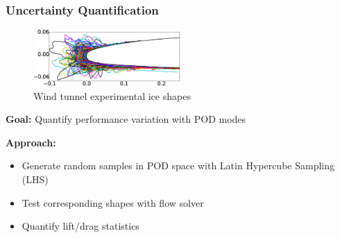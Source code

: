 \documentclass[9pt]{beamer}
\begin{document}
\begin{frame}
\frametitle{Uncertainty Quantification}
\label{sec-2-10}

\vspace*{-0.0cm}\begin{figure}
      \includegraphics[width=0.5\textwidth]{GlobalDataSet}
      \caption{Wind tunnel experimental ice shapes}
\end{figure}
\textbf{Goal:} Quantify performance variation with POD modes

\textbf{Approach:}
\begin{itemize}
\item Generate random samples in POD space with Latin Hypercube Sampling (LHS)
\item Test corresponding shapes with flow solver
\item Quantify lift/drag statistics
\end{itemize}
\end{frame}
\end{document}
